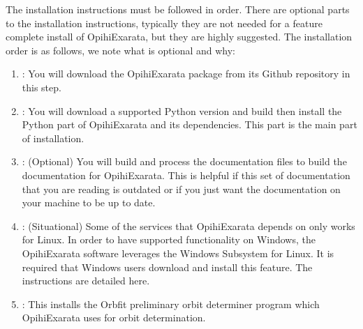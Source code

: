 \documentclass[letterpaper,11pt,english]{sphinxmanual}
\begin{document}
\sphinxAtStartPar
The installation instructions must be followed in order. There are optional
parts to the installation instructions, typically they are not needed for a
feature complete install of OpihiExarata, but they are highly suggested. The
installation order is as follows, we note what is optional and why:
\begin{enumerate}
%
\item {} 
\sphinxAtStartPar
{\hyperref[\detokenize{technical/installation/download:technical-installation-download}]{}}: You will download the OpihiExarata package from its Github repository in this step.

\item {} 
\sphinxAtStartPar
{\hyperref[\detokenize{technical/installation/python:technical-installation-python-part}]{}}: You will download a supported Python version and build then install the Python part of OpihiExarata and its dependencies. This part is the main part of installation.

\item {} 
\sphinxAtStartPar
{\hyperref[\detokenize{technical/installation/documentation:technical-installation-documentation}]{}}: (Optional) You will build and process the documentation files to build the documentation for OpihiExarata. This is helpful if this set of documentation that you are reading is outdated or if you just want the documentation on your machine to be up to date.

\item {} 
\sphinxAtStartPar
{\hyperref[\detokenize{technical/installation/windows:technical-installation-windows-compatibility}]{}}: (Situational) Some of the services that OpihiExarata depends on only works for Linux. In order to have supported functionality on Windows, the OpihiExarata software leverages the Windows Subsystem for Linux. It is required that Windows users download and install this feature. The instructions are detailed here.

\item {} 
\sphinxAtStartPar
{\hyperref[\detokenize{technical/installation/orbfit:technical-installation-orbfit}]{}}: This installs the Orbfit preliminary orbit determiner program which OpihiExarata uses for orbit determination.

\end{enumerate}
\end{document}
